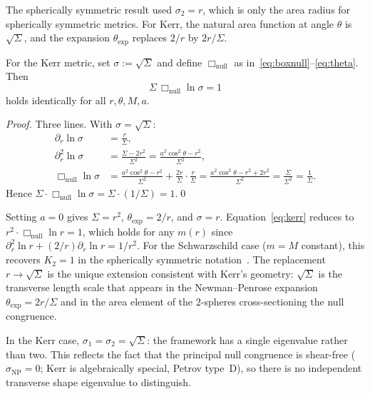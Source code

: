 \documentclass{iopart}
\begin{document}
The spherically symmetric result used $\sigma_2=r$, which is
only the area radius for spherically symmetric metrics.
For Kerr, the natural area function at angle $\theta$ is
$\sqrt{\Sigma}$, and the expansion $\theta_{\mathrm{exp}}$
replaces $2/r$ by $2r/\Sigma$.

\begin{theorem}[$K{=}1$ for Kerr]\label{thm:kerr}
For the Kerr metric, set $\sigma:=\sqrt{\Sigma}$ and define
$\Box_{\mathrm{null}}$ as in~\eqref{eq:boxnull}--\eqref{eq:theta}.
Then
\begin{equation}\label{eq:kerr}
  \Sigma\,\Box_{\mathrm{null}}\ln\sigma = 1
\end{equation}
holds identically for all $r,\theta,M,a$.
\end{theorem}

\begin{proof}
Three lines. With $\sigma=\sqrt{\Sigma}$:
\begin{align*}
  \partial_r\ln\sigma &= \frac{r}{\Sigma},\\
  \partial_r^2\ln\sigma &= \frac{\Sigma-2r^2}{\Sigma^2}
    = \frac{a^2\cos^2\!\theta-r^2}{\Sigma^2},\\
  \Box_{\mathrm{null}}\ln\sigma
    &= \frac{a^2\cos^2\!\theta-r^2}{\Sigma^2}
      +\frac{2r}{\Sigma}\cdot\frac{r}{\Sigma}
    = \frac{a^2\cos^2\!\theta-r^2+2r^2}{\Sigma^2}
    = \frac{\Sigma}{\Sigma^2}
    = \frac{1}{\Sigma}.
\end{align*}
Hence $\Sigma\cdot\Box_{\mathrm{null}}\ln\sigma
      =\Sigma\cdot(1/\Sigma)=1$.\qed
\end{proof}

\begin{remark}
Setting $a=0$ gives $\Sigma=r^2$, $\theta_{\mathrm{exp}}=2/r$,
and $\sigma=r$.  Equation~\eqref{eq:kerr} reduces to
$r^2\cdot\Box_{\mathrm{null}}\ln r=1$, which holds for any
$m(r)$ since $\partial_r^2\ln r+(2/r)\partial_r\ln r=1/r^2$.
For the Schwarzschild case ($m=M$ constant), this recovers
$K_2=1$ in the spherically symmetric notation~\cite{K1}.
The replacement $r\to\sqrt{\Sigma}$ is the unique extension
consistent with Kerr's geometry: $\sqrt{\Sigma}$ is the
transverse length scale that appears in the Newman--Penrose
expansion $\theta_{\mathrm{exp}}=2r/\Sigma$ and in the
area element of the 2-spheres cross-sectioning the null
congruence.
\end{remark}

\begin{remark}
In the Kerr case, $\sigma_1=\sigma_2=\sqrt{\Sigma}$: the
framework has a single eigenvalue rather than two.
This reflects the fact that the principal null congruence
is shear-free ($\sigma_{\scriptscriptstyle\mathrm{NP}}=0$;
Kerr is algebraically special, Petrov type~D), so there is
no independent transverse shape eigenvalue to distinguish.
\end{remark}
\end{document}
